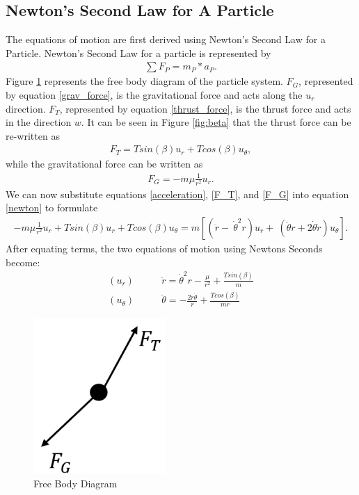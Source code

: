 \documentclass[]{article}
\begin{document}
\subsection{Newton's Second Law for A Particle}
The equations of motion are first derived using Newton's Second Law for a Particle. Newton's Second Law for a particle is represented by
\begin{align}
	\sum{F_{P}} = m_{P} * a_{P}. \label{newton}
\end{align}
\vspace{2mm}\newline
Figure \ref{fig:FBD} represents the free body diagram of the particle system. \(F_{G}\), represented by equation \ref{grav_force}, is the gravitational force and acts along the \(u_{r}\) direction. \(F_{T}\), represented by equation \ref{thrust_force}, is the thrust force and acts in the direction \(w\). It can be seen in Figure \ref{fig:beta} that the thrust force can be re-written as 
\begin{align}
	F_{T} = Tsin(\beta)u_{r} + Tcos(\beta)u_{\theta}, \label{F_T}
\end{align}
while the gravitational force can be written as
\begin{align}
	F_{G} = -m\mu\frac{1}{r^2}u_{r}. \label{F_G}
\end{align}
We can now substitute equations \ref{acceleration},  \ref{F_T}, and \ref{F_G} into equation \ref{newton} to formulate
\begin{align*}
	 -m\mu\frac{1}{r^2}u_{r} + Tsin(\beta)u_{r} + Tcos(\beta)u_{\theta} = m[(\ddot{r} -\ \dot{\theta}^2r)u_{r} +\ (\ddot{\theta}r+2\dot{\theta}\dot{r})u_{\theta}]. 
\end{align*}
After equating terms, the two equations of motion using Newtons Seconds become:
\begin{align}
	(u_{r})\qquad      &  \ddot{r}      = \dot{\theta}^2r - \frac{\mu}{r^2} + \frac{Tsin(\beta)}{m} \label{eom1}\\
	(u_{\theta})\qquad &  \ddot{\theta} = -\frac{2\dot{r}\dot{\theta}}{r}   + \frac{Tcos(\beta)}{mr} \label{eom2}
\end{align}
\begin{figure}
    \centering
	\includegraphics[width=50mm,scale=0.5]{FBD.png}
	\caption{Free Body Diagram}
	\label{fig:FBD}
\end{figure}
\end{document}

